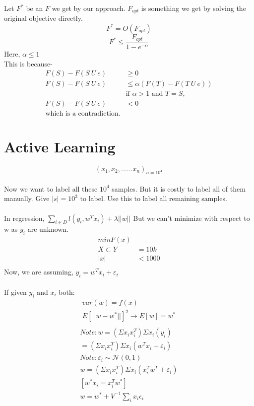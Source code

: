 \documentclass[11pt, twosides]{article}
\begin{document}
Let $F^*$ be an $F$ we get by our approach. $F_{opt}$ is something we get by solving the original objective directly.\\
$$F^* = O(F_{opt})$$
$$F^* \leq \frac{F_{opt}}{1-e^{-\alpha}}$$
Here, $\alpha \leq 1$\\
This is because-\\
\begin{align*}
    F(S) - F(S\ U\ e) &\geq 0\\
    F(S) - F(S\ U\ e) &\leq \alpha(F(T)-F(T\ U \ e))\\
    &\mbox{if $\alpha > 1$ and $T=S$,}\\
     F(S) - F(S\ U\ e) &< 0\\
     \mbox{which is a contradiction.}
\end{align*}

\section{Active Learning}
\[(x_1, x_2, ...... x_n)_{n = 10^4}\] \\
Now we want to label all these \(10^4\) samples. But it is costly to label all of them manually. Give \(|s| = 10^3\) to label. Use this to label all remaining samples.\\\\
In regression, \(\sum \limits_{i \in D} l(y_i, w^Tx_i) + \lambda ||w||\) But we can't minimize with respect to w as \(y_i\) are unknown.\\
\begin{align*}
    min F(x)&    \\
X \subset Y &= 10k\\
|x| &< 1000\\
\end{align*}
Now, we are assuming, \(y_i = w^Tx_i + \varepsilon _i\) \\\\
If given \(y_i\) and \(x_i\) both:
\begin{align*}
    var(w) = f(x)\\
    E[||w-w^*||]^2 \longrightarrow E[w] = w^*\\
\end{align*}
\begin{align*}
    Note: w = (\Sigma x_ix_i^T)\Sigma x_i(y_i) \\
= (\Sigma x_ix_i^T)\Sigma x_i(w^Tx_i + \varepsilon _i) \\
Note: \varepsilon_i \sim \mathcal{N}(0,1) \\
w = (\Sigma x_ix_i^T)\Sigma x_i(x_i^Tw^T + \varepsilon _i)\\
[w^*x_i = x_i^Tw^*]\\
w = w^* + V^{-1} \sum_i x_i \epsilon_i
\end{align*}
\end{document}
